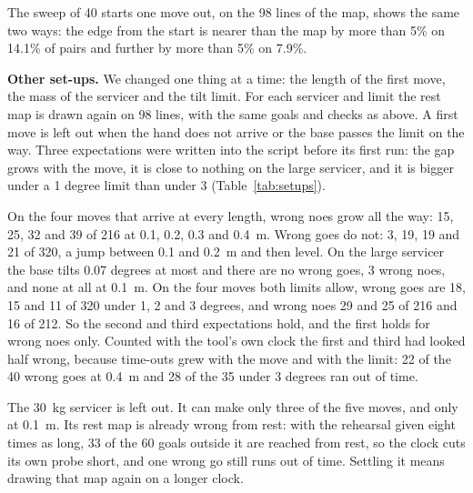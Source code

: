 \documentclass[pdflatex,sn-mathphys-num]{sn-jnl}
\begin{document}
The sweep of 40 starts one move out, on the 98 lines of the map, shows the same two ways: the edge from the start is
nearer than the map by more than 5\% on 14.1\% of pairs and further by more than 5\% on 7.9\%. %

\textbf{Other set-ups.} We changed one thing at a time: the length of the first move, the mass of the servicer and
the tilt limit. For each servicer and limit the rest map is drawn again on 98 lines, with the same goals and checks
as above. A first move is left out when the hand does not arrive or the base passes the limit on the way. Three
expectations were written into the script before its first run: the gap grows with the move, it is close to
nothing on the large servicer, and it is bigger under a 1 degree limit than under 3 (Table~\ref{tab:setups}).

On the four moves that arrive at every length, wrong noes grow all the way: 15, 25, 32 and 39 of 216 at 0.1, 0.2,
0.3 and 0.4~m. Wrong goes do not: 3, 19, 19 and 21 of 320, a jump between 0.1 and 0.2~m and then level. On the
large servicer the base tilts 0.07 degrees at most and there are no wrong goes, 3 wrong noes, and none at all at
0.1~m. On the four moves both limits allow, wrong goes are 18, 15 and 11 of 320 under 1, 2 and 3 degrees, and wrong
noes 29 and 25 of 216 and 16 of 212. So the second and third expectations hold, and the first holds for wrong noes
only. Counted with the tool's own clock the first and third had looked half wrong, because time-outs grew with the
move and with the limit: 22 of the 40 wrong goes at 0.4~m and 28 of the 35 under 3 degrees ran out of time.

The 30~kg servicer is left out. It can make only three of the five moves, and only at 0.1~m. Its rest map is
already wrong from rest: with the rehearsal given eight times as long, 33 of the 60 goals outside it are reached
from rest, so the clock cuts its own probe short, and one wrong go still runs out of time. Settling it means
drawing that map again on a longer clock. %
\end{document}
